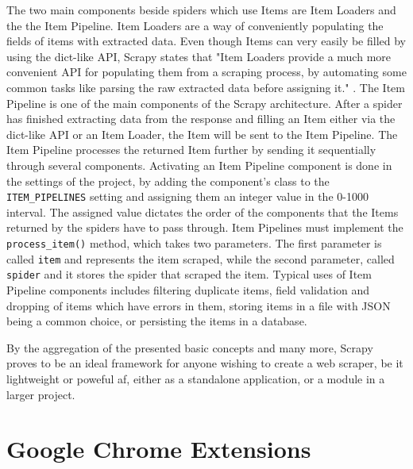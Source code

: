 \documentclass[12pt,a4paper,twoside]{report}
\begin{document}
The two main components beside spiders which use Items are Item Loaders and the the Item Pipeline. Item Loaders are a way of conveniently populating the fields of items with extracted data. Even though Items can very easily be filled by using the dict-like API, Scrapy states that "Item Loaders provide a much more convenient API for populating them from a scraping process, by automating some common tasks like parsing the raw extracted data before assigning it." \cite{scrapy_docs}. The Item Pipeline is one of the main components of the Scrapy architecture. After a spider has finished extracting data from the response and filling an Item either via the dict-like API or an Item Loader, the Item will be sent to the Item Pipeline. The Item Pipeline processes the returned Item further by sending it sequentially through several components. Activating an Item Pipeline component is done in the settings of the project, by adding the component's class to the \lstinline$ITEM_PIPELINES$ setting and assigning them an integer value in the 0-1000 interval. The assigned value dictates the order of the components that the Items returned by the spiders have to pass through. Item Pipelines must implement the \lstinline$process_item()$ method, which takes two parameters. The first parameter is called \lstinline$item$ and represents the item scraped, while the second parameter, called \lstinline$spider$ and it stores the spider that scraped the item. Typical uses of Item Pipeline components includes filtering duplicate items, field validation and dropping of items which have errors in them, storing items in a file with JSON being a common choice, or persisting the items in a database.

By the aggregation of the presented basic concepts and many more, Scrapy proves to be an ideal framework for anyone wishing to create a web scraper, be it lightweight or poweful af, either as a standalone application, or a module in a larger project.


\section{Google Chrome Extensions}
\end{document}
